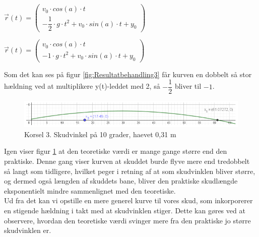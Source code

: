 \begin{center}
\begin{math}
\overrightarrow{r}(t) = 
\begin{pmatrix}
v_{0} \cdot cos(a) \cdot t\\
- \dfrac{1}{2} \cdot g \cdot t^{2} + v_{0} \cdot sin(a) \cdot t + y_{0}
\end{pmatrix}
\end{math}
\end{center}

\begin{center}
\begin{math}
\overrightarrow{r}(t) = 
\begin{pmatrix}
v_{0} \cdot cos(a) \cdot t\\
-1 \cdot g \cdot t^{2} + v_{0} \cdot sin(a) \cdot t + y_{0}
\end{pmatrix}
\end{math}
\end{center}

Som det kan ses på figur \ref{fig:Resultatbehandling3} får kurven en dobbelt så stor hældning ved at multiplikere y(t)-leddet med 2, så $-\dfrac{1}{2}$ bliver til $-1$.

\begin{figure}[H]
\centering
\includegraphics[scale=0.7]{Billeder/Resultatbehandling4.png}
\caption{Korsel 3. Skudvinkel på 10 grader, haevet 0,31 m}
\label{fig:Resultatbehandling4}
\end{figure}

Igen viser figur \ref{fig:Resultatbehandling4} at den teoretiske værdi er mange gange større end den praktiske. Denne gang viser kurven at skuddet burde flyve mere end tredobbelt så langt som tidligere, hvilket peger i retning af at som skudvinklen bliver større, og dermed også længden af skuddets bane, bliver 
den praktiske skudlængde eksponentielt mindre sammenlignet med den teoretiske.\\

Ud fra det kan vi opstille en mere generel kurve til vores skud, som inkorporerer en stigende hældning i takt med at skudvinklen stiger. Dette kan gøres ved at observere, hvordan den teoretiske værdi svinger mere fra den praktiske jo større skudvinklen er. \\

